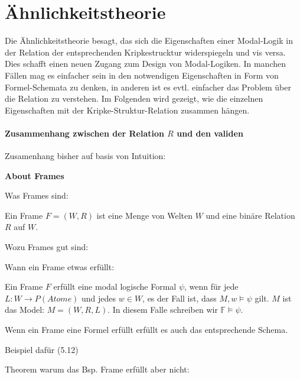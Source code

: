 \section{Ähnlichkeitstheorie} %
\label{sub:Aehnlichkeitstheorie}

Die Ähnlichkeitstheorie besagt, das sich die Eigenschaften einer Modal-Logik in der Relation der entsprechenden Kripkestrucktur widerspiegeln und vis versa. 
Dies schafft einen neuen Zugang zum Design von Modal-Logiken. 
In manchen Fällen mag es einfacher sein in den notwendigen Eigenschaften in Form von Formel-Schemata zu denken, in anderen ist es evtl. einfacher das Problem über die Relation zu verstehen. 
Im Folgenden wird gezeigt, wie die einzelnen Eigenschaften mit der Kripke-Struktur-Relation zusammen hängen.


\paragraph{Zusammenhang zwischen der Relation $R$ und den validen \formelSchemata}

Zusamenhang bisher auf basis von Intuition:



\textbf{About Frames}

Was Frames sind:
\begin{definition}
	\label{def:frame}
	Ein Frame $F = (W,R)$ ist eine Menge von Welten $W$ und eine binäre Relation $R$ auf $W$.
\end{definition}
\cite[S.322]{huth2004logic}

Wozu Frames gut sind:


Wann ein Frame etwas erfüllt:
\begin{definition}
	\label{def:frame_erfuellt}
	Ein Frame $F$ erfüllt eine modal logische Formal $\psi$, wenn für jede  $L: W \rightarrow P(Atome)$ und jedes $w \in W$, es der Fall ist, dass $M,w \vDash \psi$ gilt. $M$ ist das Model: $M = (W,R,L)$.
	In diesem Falle schreiben wir $\mathds{F} \vDash \psi$.
	\cite[S.322f]{huth2004logic}
\end{definition}

Wenn ein Frame eine Formel erfüllt erfüllt es auch das entsprechende Schema.


Beispiel dafür (5.12)

Theorem warum das Bsp. Frame \TFormel erfüllt aber \vierFormel nicht:

